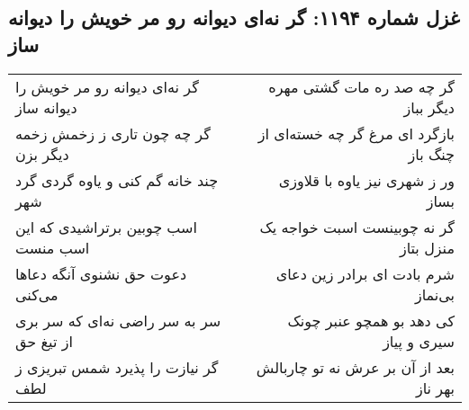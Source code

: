 \begin{center}
\section*{غزل شماره ۱۱۹۴: گر نه‌ای دیوانه رو مر خویش را دیوانه ساز}
\label{sec:1194}
\begin{longtable}{l p{0.5cm} r}
گر نه‌ای دیوانه رو مر خویش را دیوانه ساز
&&
گر چه صد ره مات گشتی مهره دیگر بباز
\\
گر چه چون تاری ز زخمش زخمه دیگر بزن
&&
بازگرد ای مرغ گر چه خسته‌ای از چنگ باز
\\
چند خانه گم کنی و یاوه گردی گرد شهر
&&
ور ز شهری نیز یاوه با قلاوزی بساز
\\
اسب چوبین برتراشیدی که این اسب منست
&&
گر نه چوبینست اسبت خواجه یک منزل بتاز
\\
دعوت حق نشنوی آنگه دعاها می‌کنی
&&
شرم بادت ای برادر زین دعای بی‌نماز
\\
سر به سر راضی نه‌ای که سر بری از تیغ حق
&&
کی دهد بو همچو عنبر چونک سیری و پیاز
\\
گر نیازت را پذیرد شمس تبریزی ز لطف
&&
بعد از آن بر عرش نه تو چاربالش بهر ناز
\\
\end{longtable}
\end{center}
